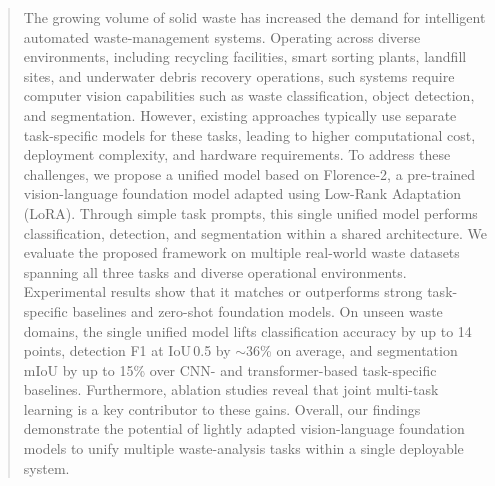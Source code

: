 \documentclass[conference]{IEEEtran}
\begin{document}
\begin{abstract}
\normalfont
The growing volume of solid waste has increased the demand for intelligent automated waste-management systems.
Operating across diverse environments, including recycling facilities, smart sorting plants, landfill sites, and underwater debris recovery operations, such systems require computer vision capabilities such as waste classification, object detection, and segmentation.
However, existing approaches typically use separate task-specific models for these tasks, leading to higher computational cost, deployment complexity, and hardware requirements.
To address these challenges, we propose a unified model based on Florence-2, a pre-trained vision-language foundation model adapted using Low-Rank Adaptation (LoRA). Through simple task prompts, this single unified model performs classification, detection, and segmentation within a shared architecture. We evaluate the proposed framework on multiple real-world waste datasets spanning all three tasks and diverse operational environments. Experimental results show that it matches or outperforms strong task-specific baselines and zero-shot foundation models. On unseen waste domains, the single unified model lifts classification accuracy by up to 14 points, detection F1 at IoU\,0.5 by $\sim$36\% on average, and segmentation mIoU by up to 15\% over CNN- and transformer-based task-specific baselines. Furthermore, ablation studies reveal that joint multi-task learning is a key contributor to these gains.
Overall, our findings demonstrate the potential of lightly adapted vision-language foundation models to unify multiple waste-analysis tasks within a single deployable system.


\end{abstract}


\end{document}
